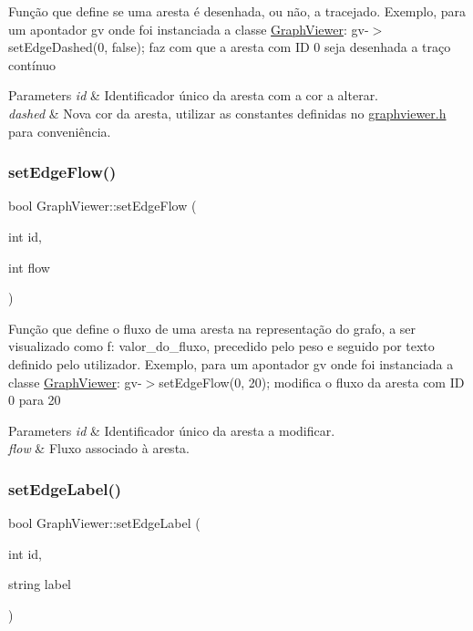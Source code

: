 Função que define se uma aresta é desenhada, ou não, a tracejado. Exemplo, para um apontador gv onde foi instanciada a classe \mbox{\hyperlink{class_graph_viewer}{Graph\+Viewer}}\+: gv-\/$>$set\+Edge\+Dashed(0, false); faz com que a aresta com ID 0 seja desenhada a traço contínuo


\begin{DoxyParams}{Parameters}
{\em id} & Identificador único da aresta com a cor a alterar. \\
\hline
{\em dashed} & Nova cor da aresta, utilizar as constantes definidas no \mbox{\hyperlink{graphviewer_8h_source}{graphviewer.\+h}} para conveniência. \\
\hline
\end{DoxyParams}
\mbox{\label{class_graph_viewer_a69eb065145063e4dea41961e92e35c8e}} 
\subsubsection{\texorpdfstring{setEdgeFlow()}{setEdgeFlow()}}
{\footnotesize\ttfamily bool Graph\+Viewer\+::set\+Edge\+Flow (\begin{DoxyParamCaption}\item[{int}]{id,  }\item[{int}]{flow }\end{DoxyParamCaption})}

Função que define o fluxo de uma aresta na representação do grafo, a ser visualizado como f\+: valor\+\_\+do\+\_\+fluxo, precedido pelo peso e seguido por texto definido pelo utilizador. Exemplo, para um apontador gv onde foi instanciada a classe \mbox{\hyperlink{class_graph_viewer}{Graph\+Viewer}}\+: gv-\/$>$set\+Edge\+Flow(0, 20); modifica o fluxo da aresta com ID 0 para 20


\begin{DoxyParams}{Parameters}
{\em id} & Identificador único da aresta a modificar. \\
\hline
{\em flow} & Fluxo associado à aresta. \\
\hline
\end{DoxyParams}
\mbox{\label{class_graph_viewer_a447cca0064e785654c2105602c2961ca}} 
\subsubsection{\texorpdfstring{setEdgeLabel()}{setEdgeLabel()}}
{\footnotesize\ttfamily bool Graph\+Viewer\+::set\+Edge\+Label (\begin{DoxyParamCaption}\item[{int}]{id,  }\item[{string}]{label }\end{DoxyParamCaption})}

